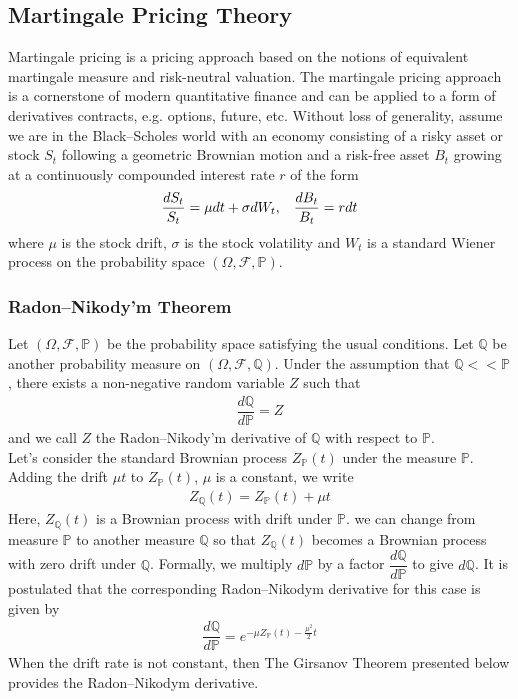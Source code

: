 \subsection{Martingale Pricing Theory}
Martingale pricing is a pricing approach based on the notions of equivalent martingale measure and risk-neutral valuation. The martingale pricing approach is a cornerstone of modern quantitative finance and can be applied to a form of derivatives contracts, e.g. options, future, etc. Without loss of generality, assume we are in the Black–Scholes world with an economy consisting of a risky asset or stock $S_t$ following a geometric Brownian
motion and a risk-free asset $B_t$ growing at a continuously compounded interest rate $r$ of the form\\
\begin{align*}
\dfrac{dS_t}{S_t}=\mu dt+\sigma dW_t, \hspace{0.3cm} \dfrac{dB_t}{B_t}=rdt
\end{align*}
where $\mu$ is the stock drift, $\sigma$ is the stock volatility and $W_t$ is a standard Wiener process on the
probability space $(\Omega, \mathcal{F}, \mathbb{P})$.

\subsubsection*{Radon–Nikody'm Theorem}
Let $(\Omega,\mathcal{F},\mathbb{P})$ be the probability space satisfying
the usual conditions. Let $\mathbb{Q}$ be another probability measure on $(\Omega,\mathcal{F},\mathbb{Q})$. Under the assumption
that $\mathbb{Q} << \mathbb{P}$, there exists a non-negative random variable $Z$ such that
\begin{align*}
	\dfrac{d\mathbb{Q}}{d\mathbb{P}}=Z
\end{align*}
and we call $Z$ the Radon–Nikody'm derivative of $\mathbb{Q}$ with respect to $\mathbb{P}$.\\[0.5cm]
Let's consider the standard Brownian process $Z_\mathbb{P}(t)$ under the measure $\mathbb{P}$.
Adding the drift $\mu t$ to $Z_\mathbb{P}(t)$, $\mu$ is a constant, we write
\begin{align*}
	Z_\mathbb{Q}(t)=Z_\mathbb{P}(t)+\mu t
\end{align*}
Here, $Z_\mathbb{Q}(t)$ is a Brownian process with drift under $\mathbb{P}$. we can change from
measure $\mathbb{P}$ to another measure 
$\mathbb{Q}$ so that $Z_\mathbb{Q}(t)$ becomes a Brownian process with
zero drift under 
$\mathbb{Q}$. Formally, we multiply $d\mathbb{P}$ by a factor $\dfrac{d\mathbb{Q}}{d\mathbb{P}}$ to give $d\mathbb{Q}$. It is postulated that the corresponding
Radon–Nikodym derivative for this case is given by
\begin{align}
	\dfrac{d\mathbb{Q}}{d\mathbb{P}} = e^{-\mu Z_\mathbb{P}(t)-\frac{\mu^2}{2}t } \label{Radon}
\end{align} 
When the drift rate is not constant, then The Girsanov Theorem presented below provides the Radon–Nikodym derivative.

